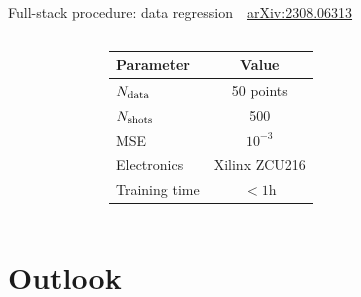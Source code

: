\documentclass[aspectratio=169, 8pt, xcolor={svgnames}, hyperref={linkcolor=black}]{beamer}
\begin{document}
\begin{frame}{Full-stack procedure: data regression \hfill \faBook\,\, \href{https://arxiv.org/abs/2308.06313}{arXiv:2308.06313}}
\begin{columns}
\begin{figure}
   \end{figure}
   \vspace{-0.3cm}
 \begin{table}
   \small
   \begin{tabular}{lc}
   \hline \hline
     \textbf{Parameter}     & \textbf{Value}  \\ \hline
     $N_{\rm data}$      & 50 points \\
     $N_{\rm shots}$ & 500 \\
     MSE & $10^{-3}$ \\
     Electronics & Xilinx ZCU216 \\
     Training time & $<1$h \\
   \hline \hline
   \end{tabular}
 \end{table}

   \end{columns}

 \end{frame}


\section{Outlook}
\end{document}
